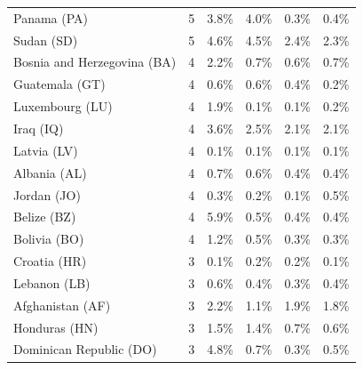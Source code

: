 {\begin{table}[ht]
{\begin{tabular}{lccccc}
Panama (PA)           &     5  & \cellcolor{red0} 3.8\% & \cellcolor{red0} 4.0\% & \cellcolor{green0} 0.3\% & \cellcolor{green0} 0.4\% \\  %
Sudan (SD)            &     5  & \cellcolor{red0} 4.6\% & \cellcolor{red0} 4.5\% & \cellcolor{green0} 2.4\% & \cellcolor{green0} 2.3\% \\  %
Bosnia and Herzegovina (BA)  &     4  & \cellcolor{red2} 2.2\% & 0.7\% & \cellcolor{green0} 0.6\% & 0.7\% \\  %
Guatemala (GT)        &     4  & \cellcolor{red1} 0.6\% & \cellcolor{red0} 0.6\% & 0.4\% & \cellcolor{green2} 0.2\% \\  %
Luxembourg (LU)       &     4  & \cellcolor{red2} 1.9\% & \cellcolor{green0} 0.1\% & \cellcolor{green0} 0.1\% & 0.2\% \\  %
Iraq (IQ)             &     4  & \cellcolor{red0} 3.6\% & 2.5\% & 2.1\% & 2.1\% \\  %
Latvia (LV)           &     4  & 0.1\% & 0.1\% & 0.1\% & 0.1\% \\  %
Albania (AL)          &     4  & \cellcolor{red1} 0.7\% & 0.6\% & \cellcolor{green0} 0.4\% & \cellcolor{green0} 0.4\% \\  %
Jordan (JO)           &     4  & 0.3\% & 0.2\% & \cellcolor{green1} 0.1\% & \cellcolor{red1} 0.5\% \\  %
Belize (BZ)           &     4  & \cellcolor{red5}  5.9\% & \cellcolor{green0} 0.5\% & \cellcolor{green0} 0.4\% & \cellcolor{green0} 0.4\% \\  %
Bolivia (BO)          &     4  & \cellcolor{red2} 1.2\% & 0.5\% & \cellcolor{green0} 0.3\% & \cellcolor{green0} 0.3\% \\  %
Croatia (HR)          &     3  & \cellcolor{green1} 0.1\% & \cellcolor{red2} 0.2\% & 0.2\% & \cellcolor{green1} 0.1\% \\  %
Lebanon (LB)          &     3  & \cellcolor{red5}  0.6\% & 0.4\% & \cellcolor{green1} 0.3\% & 0.4\% \\  %
Afghanistan (AF)      &     3  & \cellcolor{red0} 2.2\% & \cellcolor{green1} 1.1\% & 1.9\% & 1.8\% \\  %
Honduras (HN)         &     3  & \cellcolor{red0} 1.5\% & \cellcolor{red0} 1.4\% & \cellcolor{green0} 0.7\% & \cellcolor{green0} 0.6\% \\  %
Dominican Republic (DO)  &     3  & \cellcolor{red5}  4.8\% & \cellcolor{green0} 0.7\% & \cellcolor{green1} 0.3\% & \cellcolor{green0} 0.5\% \\  %


\end{tabular}}
\end{table}}
